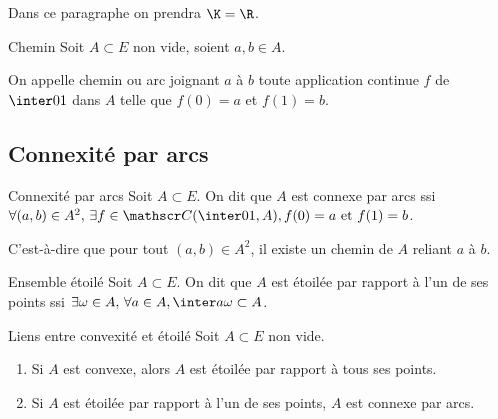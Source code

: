 Dans ce paragraphe on prendra $\K = \R$.

\begin{definition}{Chemin}{}
    Soit $A \subset E$ non vide, soient $a, b \in A$. 

    On appelle chemin ou arc joignant $a$ à $b$ toute application continue $f$ de 
    $\inter 0 1$ dans $A$ telle que $f(0) = a$ et $f(1) = b$.
\end{definition}

\subsection{Connexité par arcs}

\begin{definition}{Connexité par arcs}{}
    Soit $A \subset E$. 
    On dit que $A$ est connexe par arcs ssi $\forall (a, b) \in A^2, \, \exists f \in \mathscr C(\inter 0 1, A), f(0) = a \text{ et } f(1) = b$. 

    C'est-à-dire que pour tout $(a, b) \in A^2$, il existe un chemin de $A$ reliant $a$ à $b$.
\end{definition}

\begin{definition}{Ensemble étoilé}{}
    Soit $A \subset E$.
    On dit que $A$ est étoilée par rapport à l'un de ses points ssi $\exists \omega \in A, 
    \, \forall a \in A, \inter a \omega \subset A$.
\end{definition}

\begin{proposition}{Liens entre convexité et étoilé}{}
    Soit $A \subset E$ non vide. 
    \begin{enumerate}
        \item Si $A$ est convexe, alors $A$ est étoilée par rapport à tous ses points. 
        \item Si $A$ est étoilée par rapport à l'un de ses points, $A$ est connexe par arcs. 
    \end{enumerate}
\end{proposition}



